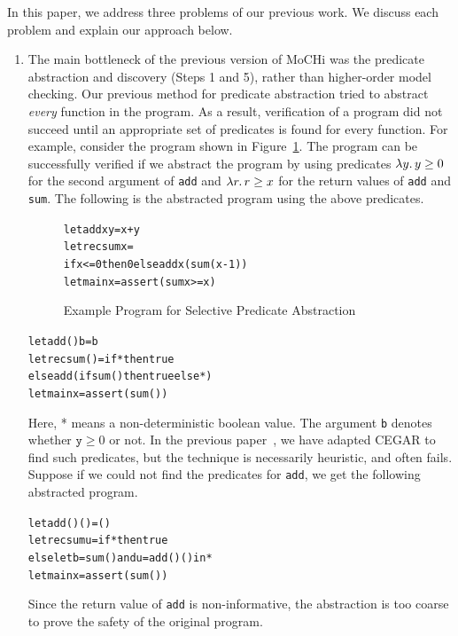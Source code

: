 In this paper, we address three problems of our previous work.
We discuss each problem and explain our approach below.

\begin{enumerate}
\item The main bottleneck of the previous version of MoCHi was the
      predicate abstraction and discovery (Steps 1 and 5), rather than
      higher-order model checking.  Our previous method for predicate
      abstraction tried to abstract \emph{every} function in the
      program. As a result, verification of a program did not succeed
      until an appropriate set of predicates is found for every
      function.  For example, consider the program shown in
      Figure~\ref{fig:sum}.  The program can be successfully verified if
      we abstract the program by using predicates $\lambda{y}.\,{y \geq 0}$
      for the second argument of \texttt{add} and $\lambda{r}.\,{r \geq x}$
      for the return values of \texttt{add} and \texttt{sum}.  The
      following is the abstracted program using the above predicates.
\begin{figure}[t]
\begin{alltt}
let add x y = x + y
let rec sum x =
  if x <= 0 then 0 else add x (sum (x-1))
let main x = assert (sum x >= x)
\end{alltt}
\caption{Example Program for Selective Predicate Abstraction}
\label{fig:sum}
\end{figure}
\begin{alltt}
let add () b = b
let rec sum () = if * then true
  else add (if sum () then true else *)
let main x = assert (sum ())
\end{alltt}
      Here, * means a non-deterministic boolean value.  The argument
      \texttt{b} denotes whether $\mathtt{y} \geq 0$ or not.
      In the previous paper~\cite{KobayashiPLDI2011}, we have adapted
      CEGAR to find such predicates, but the technique is necessarily
      heuristic, and often fails.  Suppose if we could not find the
      predicates for \texttt{add}, we get the following abstracted
      program.
\begin{alltt}
let add () () = ()
let rec sum u = if * then true
  else let b = sum () and u = add () () in *
let main x = assert (sum ())
\end{alltt}
      Since the return value of \texttt{add} is non-informative, the
      abstraction is too coarse to prove the safety of the original program.


\end{enumerate}
